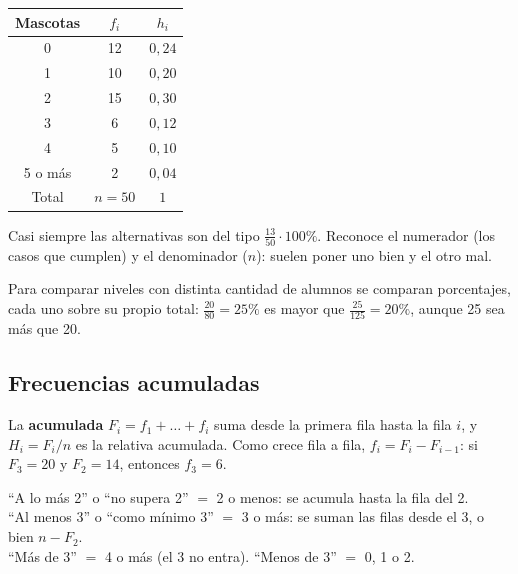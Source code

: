 \begin{minipage}[t]{0.42\linewidth}\vspace{0pt}\centering\small
\begin{tabular}{@{}ccc@{}}\toprule
Mascotas & $f_i$ & $h_i$\\\midrule
0 & 12 & $0{,}24$\\ 1 & 10 & $0{,}20$\\ 2 & 15 & $0{,}30$\\ 3 & 6 & $0{,}12$\\ 4 & 5 & $0{,}10$\\ 5 o más & 2 & $0{,}04$\\\midrule
Total & $n = 50$ & $1$\\\bottomrule
\end{tabular}
\end{minipage}\hfill
\begin{minipage}[t]{0.54\linewidth}\vspace{0pt}
\begin{ojo} Casi siempre las alternativas son del tipo $\frac{13}{50}\cdot 100\%$. Reconoce el numerador (los casos que cumplen) y el denominador ($n$): suelen poner uno bien y el otro mal.\end{ojo}
\begin{ojo} Para comparar niveles con distinta cantidad de alumnos se comparan porcentajes, cada uno sobre su propio total: $\frac{20}{80} = 25\%$ es mayor que $\frac{25}{125} = 20\%$, aunque 25 sea más que 20.\end{ojo}
\end{minipage}

\subsection{Frecuencias acumuladas}
La \textbf{acumulada} $F_i = f_1 + \dots + f_i$ suma desde la primera fila hasta la fila $i$, y $H_i = F_i/n$ es la relativa acumulada. Como crece fila a fila, $f_i = F_i - F_{i-1}$: si $F_3 = 20$ y $F_2 = 14$, entonces $f_3 = 6$.

\begin{clave}[Traducción]
``A lo más 2'' o ``no supera 2'' $=$ 2 o menos: se acumula hasta la fila del 2.\\
``Al menos 3'' o ``como mínimo 3'' $=$ 3 o más: se suman las filas desde el 3, o bien $n - F_2$.\\
``Más de 3'' $=$ 4 o más (el 3 no entra). ``Menos de 3'' $=$ 0, 1 o 2.
\end{clave}

